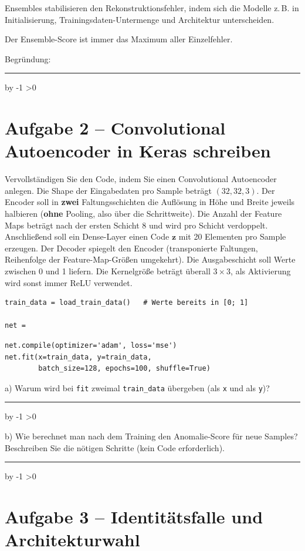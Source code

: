 \documentclass[10pt,a4paper]{article}
\newcommand{\mcbox}{\raisebox{-1pt}{\fbox{\rule{0pt}{7pt}\rule{7pt}{0pt}}}\hspace{6pt}}
\newcommand{\antwortlinien}[1]{%
  \par\vspace{2pt}%
  \newcount\zeilen \zeilen=#1
  \loop
    \noindent\rule{\linewidth}{0.4pt}\par\vspace{11pt}%
    \advance\zeilen by -1
  \ifnum\zeilen>0 \repeat
}
\begin{document}
\mcbox Ensembles stabilisieren den Rekonstruktionsfehler, indem sich die Modelle z.\,B. in
Initialisierung, Trainingsdaten-Untermenge und Architektur unterscheiden.

\mcbox Der Ensemble-Score ist immer das Maximum aller Einzelfehler.

Begründung:
\antwortlinien{2}

\section*{Aufgabe 2 -- Convolutional Autoencoder in Keras schreiben}

Vervollständigen Sie den Code, indem Sie einen Convolutional Autoencoder anlegen.
Die Shape der Eingabedaten pro Sample beträgt $(32, 32, 3)$.
Der Encoder soll in \textbf{zwei} Faltungsschichten die Auflösung in Höhe und Breite
jeweils halbieren (\textbf{ohne} Pooling, also über die Schrittweite). Die Anzahl der Feature
Maps beträgt nach der ersten Schicht 8 und wird pro Schicht verdoppelt. Anschließend soll
ein Dense-Layer einen Code $\boldsymbol{z}$ mit 20 Elementen pro Sample erzeugen.
Der Decoder spiegelt den Encoder (transponierte Faltungen, Reihenfolge der
Feature-Map-Größen umgekehrt). Die Ausgabeschicht soll Werte zwischen 0 und 1 liefern.
Die Kernelgröße beträgt überall $3\times3$, als Aktivierung wird sonst immer ReLU verwendet.

\begin{lstlisting}
train_data = load_train_data()   # Werte bereits in [0; 1]

net =
\end{lstlisting}

\vspace{8.5cm}

\begin{lstlisting}
net.compile(optimizer='adam', loss='mse')
net.fit(x=train_data, y=train_data,
        batch_size=128, epochs=100, shuffle=True)
\end{lstlisting}

a) Warum wird bei \texttt{fit} zweimal \texttt{train\_data} übergeben (als \texttt{x} und
als \texttt{y})?
\antwortlinien{2}

b) Wie berechnet man nach dem Training den Anomalie-Score für neue Samples?
Beschreiben Sie die nötigen Schritte (kein Code erforderlich).
\antwortlinien{3}

\section*{Aufgabe 3 -- Identitätsfalle und Architekturwahl}
\end{document}
